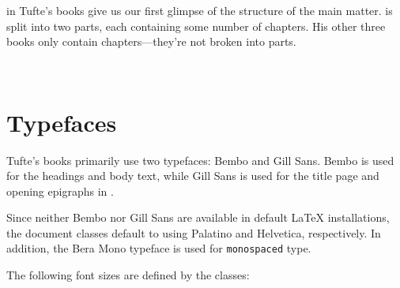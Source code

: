  in Tufte's books give us our first
glimpse of the structure of the main matter.  \VDQI is split into two
parts, each containing some number of chapters.  His other three books only
contain chapters---they're not broken into parts.

\begin{figure*}[p]
\hfill
{}
\\\vspace{\baselineskip}
\hfill
{}
\end{figure*}


\section{Typefaces}\label{sec:typefaces1}

Tufte's books primarily use two typefaces: Bembo and Gill Sans.  Bembo is used
for the headings and body text, while Gill Sans is used for the title page and
opening epigraphs in \BE.

Since neither Bembo nor Gill Sans are available in default \LaTeX{}
installations, the \TL document classes default to using Palatino and
Helvetica, respectively.  In addition, the Bera Mono typeface is used for
\texttt{monospaced} type.

The following font sizes are defined by the \TL classes:

